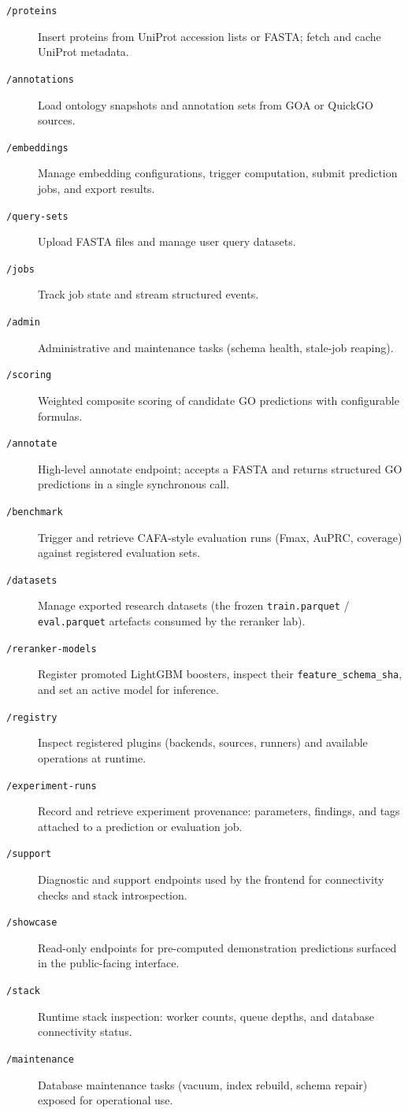 \begin{description}
  \item[\texttt{/proteins}] Insert proteins from UniProt accession lists or FASTA;
    fetch and cache UniProt metadata.
  \item[\texttt{/annotations}] Load ontology snapshots and annotation sets from
    GOA or QuickGO sources.
  \item[\texttt{/embeddings}] Manage embedding configurations, trigger computation,
    submit prediction jobs, and export results.
  \item[\texttt{/query-sets}] Upload FASTA files and manage user query datasets.
  \item[\texttt{/jobs}] Track job state and stream structured events.
  \item[\texttt{/admin}] Administrative and maintenance tasks (schema health,
    stale-job reaping).
  \item[\texttt{/scoring}] Weighted composite scoring of candidate GO predictions
    with configurable formulas.
  \item[\texttt{/annotate}] High-level annotate endpoint; accepts a FASTA and
    returns structured GO predictions in a single synchronous call.
  \item[\texttt{/benchmark}] Trigger and retrieve CAFA-style evaluation runs
    (Fmax, AuPRC, coverage) against registered evaluation sets.
  \item[\texttt{/datasets}] Manage exported research datasets (the frozen
    \texttt{train.parquet} / \texttt{eval.parquet} artefacts consumed by the
    reranker lab).
  \item[\texttt{/reranker-models}] Register promoted LightGBM boosters, inspect
    their \texttt{feature\_schema\_sha}, and set an active model for inference.
  \item[\texttt{/registry}] Inspect registered plugins (backends, sources,
    runners) and available operations at runtime.
  \item[\texttt{/experiment-runs}] Record and retrieve experiment provenance:
    parameters, findings, and tags attached to a prediction or evaluation job.
  \item[\texttt{/support}] Diagnostic and support endpoints used by the frontend
    for connectivity checks and stack introspection.
  \item[\texttt{/showcase}] Read-only endpoints for pre-computed demonstration
    predictions surfaced in the public-facing interface.
  \item[\texttt{/stack}] Runtime stack inspection: worker counts, queue depths,
    and database connectivity status.
  \item[\texttt{/maintenance}] Database maintenance tasks (vacuum, index rebuild,
    schema repair) exposed for operational use.
\end{description}

